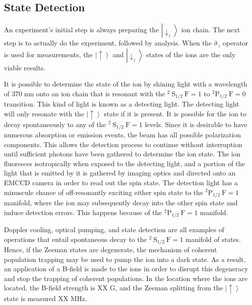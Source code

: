 \subsection{State Detection}

An experiment's initial step is always preparing the $\left|\downarrow_z\right\rangle$ ion chain. The next step is to actually do the experiment, followed by analysis. When the $\hat{\sigma}_z$ operator is used for measurements, the $\left|\uparrow\right\rangle$ and $\left|\downarrow_z\right\rangle$ states of the ions are the only viable results.

It is possible to determine the state of the ion by shining light with a wavelength of 370 nm onto an ion chain that is resonant with the ${ }^2 \mathrm{~S}_{1 / 2} \mathrm{~F}=1$ to ${ }^2 \mathrm{P}_{1 / 2} \mathrm{~F}=0$ transition. This kind of light is known as a detecting light. The detecting light will only resonate with the $\left|\uparrow\right\rangle$ state if it is present. It is possible for the ion to decay spontaneously to any of the ${ }^2 \mathrm{~S}_{1 / 2} \mathrm{~F}=1$ levels. Since it is desirable to have numerous absorption or emission events, the beam has all possible polarization components. This allows the detection process to continue without interruption until sufficient photons have been gathered to determine the ion state. The ion fluoresces isotropically when exposed to the detecting light, and a portion of the light that is emitted by it is gathered by imaging optics and directed onto an EMCCD camera in order to read out the spin state. The detection light has a minuscule chance of off-resonantly exciting either spin state to the ${ }^2 \mathrm{P}_{1 / 2} \mathrm{~F}=1$ manifold, where the ion may subsequently decay into the other spin state and induce detection errors. This happens because of the ${ }^2 \mathrm{P}_{1 / 2} \mathrm{~F}=1$ manifold.

Doppler cooling, optical pumping, and state detection are all examples of operations that entail spontaneous decay to the ${ }^2 \mathrm{~S}_{1 / 2} \mathrm{~F}=1$ manifold of states. Hence, if the Zeeman states are degenerate, the mechanism of coherent population trapping may be used to pump the ion into a dark state. As a result, an application of a B-field is made to the ions in order to disrupt this degeneracy and stop the trapping of coherent populations. In the location where the ions are located, the B-field strength is XX G, and the Zeeman splitting from the $\left|\uparrow\right\rangle$ state is measured XX MHz.

